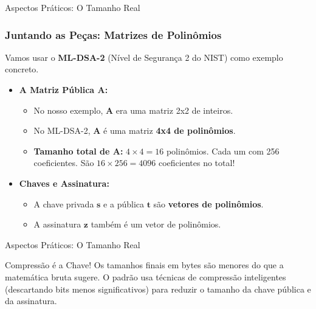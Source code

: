 \documentclass{beamer}
\begin{document}
\begin{frame}{Aspectos Práticos: O Tamanho Real}
    \frametitle{Juntando as Peças: Matrizes de Polinômios}

    Vamos usar o \textbf{ML-DSA-2} (Nível de Segurança 2 do NIST) como exemplo concreto.

    \begin{itemize}
        \item \textbf{A Matriz Pública $\mathbf{A}$:}
            \begin{itemize}
                \item No nosso exemplo, $\mathbf{A}$ era uma matriz 2x2 de inteiros.
                \item No ML-DSA-2, $\mathbf{A}$ é uma matriz \textbf{4x4 de polinômios}.
                \item \textbf{Tamanho total de $\mathbf{A}$:} $4 \times 4 = 16$ polinômios. Cada um com 256 coeficientes. São $16 \times 256 = 4096$ coeficientes no total!
            \end{itemize}
        \vspace{1em}
        \item \textbf{Chaves e Assinatura:}
            \begin{itemize}
                \item A chave privada $\mathbf{s}$ e a pública $\mathbf{t}$ são \textbf{vetores de polinômios}.
                \item A assinatura $\mathbf{z}$ também é um vetor de polinômios.
            \end{itemize}
    \end{itemize}
    
\end{frame}

\begin{frame}{Aspectos Práticos: O Tamanho Real}
    \begin{alertblock}{Compressão é a Chave!}
        Os tamanhos finais em bytes são menores do que a matemática bruta sugere. O padrão usa técnicas de compressão inteligentes (descartando bits menos significativos) para reduzir o tamanho da chave pública e da assinatura.
    \end{alertblock}

    \begin{table}
    \centering
    \caption{Tamanhos Finais em Bytes (ML-DSA-2)}
    \end{table}
\end{frame}
\end{document}
